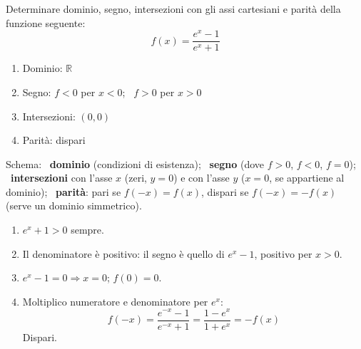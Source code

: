 \begin{question}[ID=1.14, subtitle={Studio di una funzione esponenziale razionale}, difficulty=difficile, tags={funzioni, studio di funzione, esponenziali, parità}]
Determinare dominio, segno, intersezioni con gli assi cartesiani e parità della funzione seguente:
\begin{equation*}
    f(x)=\frac{e^x-1}{e^x+1}
\end{equation*}
\begin{solution}
\begin{enumerate}
    \item Dominio: $\mathbb{R}$
    \item Segno: $f<0$ per $x<0$; \ $f>0$ per $x>0$
    \item Intersezioni: $(0,0)$
    \item Parità: dispari
\end{enumerate}
\end{solution}
\begin{explanation}
Schema: \ \textbf{dominio} (condizioni di esistenza); \ \textbf{segno} (dove $f>0$, $f<0$, $f=0$); \ \textbf{intersezioni} con l'asse $x$ (zeri, $y=0$) e con l'asse $y$ ($x=0$, se appartiene al dominio); \ \textbf{parità}: pari se $f(-x)=f(x)$, dispari se $f(-x)=-f(x)$ (serve un dominio simmetrico).
\begin{enumerate}
    \item $e^x+1>0$ sempre.
    \item Il denominatore è positivo: il segno è quello di $e^x-1$, positivo per $x>0$.
    \item $e^x-1=0 \Rightarrow x=0$; $f(0)=0$.
    \item Moltiplico numeratore e denominatore per $e^x$:
    \[ f(-x)=\dfrac{e^{-x}-1}{e^{-x}+1}=\dfrac{1-e^x}{1+e^x}=-f(x) \]
    Dispari.
\end{enumerate}
\end{explanation}
\end{question}


